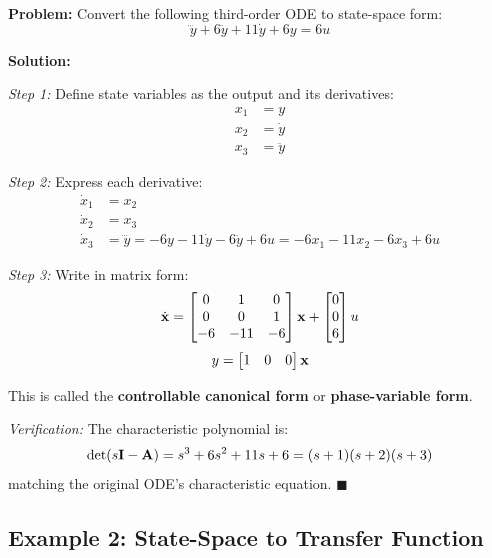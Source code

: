 \textbf{Problem:} Convert the following third-order ODE to state-space form:
\begin{equation}
    \dddot{y} + 6\ddot{y} + 11\dot{y} + 6y = 6u
\end{equation}

\textbf{Solution:}

\textit{Step 1:} Define state variables as the output and its derivatives:
\begin{align}
    x_1 &= y \\
    x_2 &= \dot{y} \\
    x_3 &= \ddot{y}
\end{align}

\textit{Step 2:} Express each derivative:
\begin{align}
    \dot{x}_1 &= x_2 \\
    \dot{x}_2 &= x_3 \\
    \dot{x}_3 &= \dddot{y} = -6y - 11\dot{y} - 6\ddot{y} + 6u = -6x_1 - 11x_2 - 6x_3 + 6u
\end{align}

\textit{Step 3:} Write in matrix form:
\begin{equation}
    \dot{\mathbf{x}} = \begin{bmatrix} 0 & 1 & 0 \\ 0 & 0 & 1 \\ -6 & -11 & -6 \end{bmatrix} \mathbf{x} +
    \begin{bmatrix} 0 \\ 0 \\ 6 \end{bmatrix} u
\end{equation}
\begin{equation}
    y = \begin{bmatrix} 1 & 0 & 0 \end{bmatrix} \mathbf{x}
\end{equation}

This is called the \textbf{controllable canonical form} or \textbf{phase-variable form}.

\textit{Verification:} The characteristic polynomial is:
\begin{equation}
    \det(s\mathbf{I} - \mathbf{A}) = s^3 + 6s^2 + 11s + 6 = (s+1)(s+2)(s+3)
\end{equation}
matching the original ODE's characteristic equation. \hfill $\blacksquare$

\subsection{Example 2: State-Space to Transfer Function}


